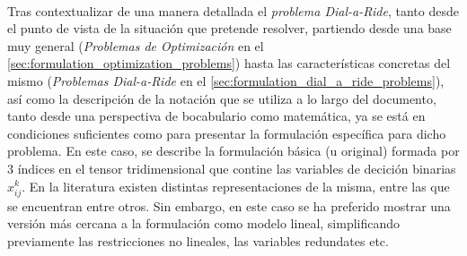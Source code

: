 \documentclass{subfiles}
\begin{document}
      \paragraph{}
      Tras contextualizar de una manera detallada el \emph{problema Dial-a-Ride}, tanto desde el punto de vista de la situación que pretende resolver, partiendo desde una base muy general (\emph{Problemas de Optimización} en el \cref{sec:formulation_optimization_problems}) hasta las características concretas del mismo (\emph{Problemas Dial-a-Ride} en el \cref{sec:formulation_dial_a_ride_problems}), así como la descripción de la notación que se utiliza a lo largo del documento, tanto desde una perspectiva de bocabulario como matemática, ya se está en condiciones suficientes como para presentar la formulación específica para dicho problema. En este caso, se describe la formulación básica (u original) formada por 3 índices en el tensor tridimensional que contine las variables de decición binarias $x_{ij}^{k}$. En la literatura existen distintas representaciones de la misma, entre las que se encuentran \cite{cordeau2006branch,ropke2007models,cordeau2007dial} entre otros. Sin embargo, en este caso se ha preferido mostrar una versión más cercana a la formulación como modelo lineal, simplificando previamente las restricciones no lineales, las variables redundates etc.
\end{document}
